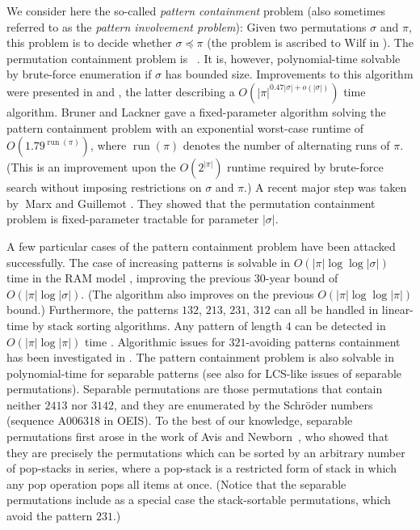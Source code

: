\documentclass[a4paper]{llncs}
\DeclareMathOperator{\RUN}{run}
\newcounter{num}
\begin{document}
	We consider here the so-called \emph{pattern containment} problem
	(also sometimes referred to as the \emph{pattern involvement problem}):
	Given two permutations $\sigma$ and $\pi$, this problem is to decide whether
	$\sigma \preceq \pi$ (the problem is ascribed to Wilf in \cite{Bose:Buss:Lubiw:1998}).
	The permutation containment problem is \NPhard~\cite{Bose:Buss:Lubiw:1998}.
	It is, however, polynomial-time solvable by brute-force enumeration
	if $\sigma$ has bounded size.
	Improvements to this algorithm were presented in
	\cite{Albert:Aldred:Atkinson:Holton:ISAAC:2001} and
	\cite{Ahal:Rabinovich:2008},
	the latter describing a $O(|\pi|^{0.47|\sigma|+o(|\sigma|)})$ time algorithm.
	Bruner and Lackner \cite{Bruner:Lackner:SWAT:2012}
	gave a fixed-parameter algorithm solving the pattern containment problem with
	an exponential worst-case runtime of $O(1.79^{\RUN(\pi)})$,
	where $\RUN(\pi)$ denotes the number of alternating runs of $\pi$.
	(This is an improvement upon the $O(2^{|\pi|})$ runtime required by
	brute-force search without imposing restrictions on $\sigma$ and $\pi$.)
	A recent major step was taken by􏰂 Marx and Guillemot
	\cite{Guillemot:Marx:SODA:2014}.
	They showed that
	the permutation containment problem is fixed-parameter tractable for
	parameter $|\sigma|$.

	A few particular cases of the pattern containment problem have been attacked successfully.
	The case of increasing patterns is solvable in
	$O(|\pi| \log \log |\sigma|)$ time in the RAM model \cite{Crochemore:Porat:2010},
	improving the previous 30-year bound of $O(|\pi| \log |\sigma|)$.
	(The algorithm also improves on the previous
	$O(|\pi| \log \log |\pi|)$ bound.)
	Furthermore, the patterns $132$, $213$, $231$, $312$ can all be handled in linear-time
	by stack sorting algorithms.
	Any pattern of length $4$ can be detected in $O(|\pi| \log |\pi|)$ time
	\cite{Albert:Aldred:Atkinson:Holton:ISAAC:2001}.
	Algorithmic issues for $321$-avoiding patterns containment has been investigated in
	\cite{Guillemot:Vialette:ISAAC:2009}.
	The pattern containment problem is also solvable in
	polynomial-time for separable patterns \cite{Ibarra:1997,Bose:Buss:Lubiw:1998}
	(see also \cite{Bouvel:Rossin:Vialette:CPM:2007} for LCS-like issues
	of separable permutations).
	Separable permutations are those permutations that contain neither
	$2413$ nor $3142$, and they are enumerated by the Schröder numbers
	(sequence A006318 in OEIS).
	To the best of our knowledge,
	separable permutations first arose in the work of
	Avis and Newborn~\cite{Avis:Newborn:1981},
	who showed that they are precisely the permutations which can be sorted by an
	arbitrary number of pop-stacks in series,
	where a pop-stack is a restricted form of stack in which any pop operation
	pops all items at once.
	(Notice that the separable permutations include as a special case the
	stack-sortable permutations, which avoid the pattern $231$.)
\end{document}
